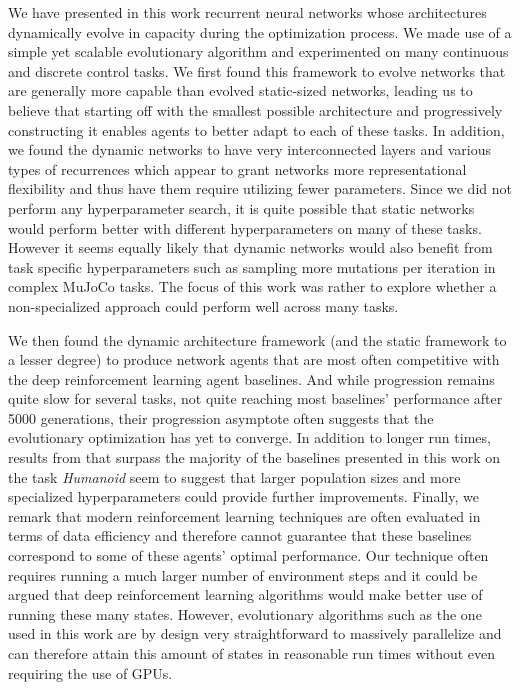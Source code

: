 \documentclass{article} %
\begin{document}
We have presented in this work recurrent neural networks whose architectures dynamically evolve in capacity during the optimization process. We made use of a simple yet scalable evolutionary algorithm and experimented on many continuous and discrete control tasks. We first found this framework to evolve networks that are generally more capable than evolved static-sized networks, leading us to believe that starting off with the smallest possible architecture and progressively constructing it enables agents to better adapt to each of these tasks. In addition, we found the dynamic networks to have very interconnected layers and various types of recurrences which appear to grant networks more representational flexibility and thus have them require utilizing fewer parameters. Since we did not perform any hyperparameter search, it is quite possible that static networks would perform better with different hyperparameters on many of these tasks. However it seems equally likely that dynamic networks would also benefit from task specific hyperparameters such as sampling more mutations per iteration in complex \mbox{MuJoCo} tasks. The focus of this work was rather to explore whether a non-specialized approach could perform well across many tasks.

We then found the dynamic architecture framework (and the static framework to a lesser degree) to produce network agents that are most often competitive with the deep reinforcement learning agent baselines. And while progression remains quite slow for several tasks, not quite reaching most baselines’ performance after 5000 generations, their progression asymptote often suggests that the evolutionary optimization has yet to converge. In addition to longer run times, results from \cite{such2017deep} that surpass the majority of the baselines presented in this work on the task \textit{Humanoid} seem to suggest that larger population sizes and more specialized hyperparameters could provide further improvements. Finally, we remark that modern reinforcement learning techniques are often evaluated in terms of data efficiency and therefore cannot guarantee that these baselines correspond to some of these agents' optimal performance. Our technique often requires running a much larger number of environment steps and it could be argued that deep reinforcement learning algorithms would make better use of running these many states. However, evolutionary algorithms such as the one used in this work are by design very straightforward to massively parallelize and can therefore attain this amount of states in reasonable run times without even requiring the use of GPUs.
\end{document}
